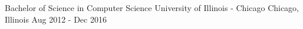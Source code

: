 

\begin{cventries}

  \cventry
    {Bachelor of Science in Computer Science} %
    {University of Illinois - Chicago} %
    {Chicago, Illinois} %
    {Aug 2012 - Dec 2016} {}

\end{cventries}
